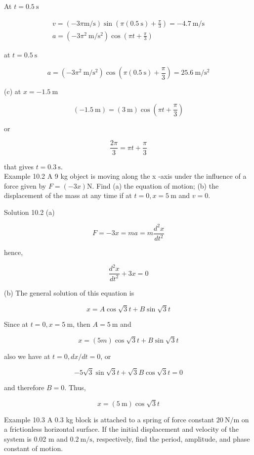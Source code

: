 \documentclass[10pt]{article}
\begin{document}
At $t=0.5 \mathrm{~s}$

$$
\begin{gathered}
v=(-3 \pi \mathrm{m} / \mathrm{s}) \sin \left(\pi(0.5 \mathrm{~s})+\frac{\pi}{3}\right)=-4.7 \mathrm{~m} / \mathrm{s} \\
a=\left(-3 \pi^{2} \mathrm{~m} / \mathrm{s}^{2}\right) \cos \left(\pi t+\frac{\pi}{3}\right)
\end{gathered}
$$

at $t=0.5 \mathrm{~s}$

$$
a=\left(-3 \pi^{2} \mathrm{~m} / \mathrm{s}^{2}\right) \cos \left(\pi(0.5 \mathrm{~s})+\frac{\pi}{3}\right)=25.6 \mathrm{~m} / \mathrm{s}^{2}
$$

(c) at $x=-1.5 \mathrm{~m}$

$$
(-1.5 \mathrm{~m})=(3 \mathrm{~m}) \cos \left(\pi t+\frac{\pi}{3}\right)
$$

or

$$
\frac{2 \pi}{3}=\pi t+\frac{\pi}{3}
$$

that gives $t=0.3 \mathrm{~s}$.\\
Example 10.2 A 9 kg object is moving along the x -axis under the influence of a force given by $F=(-3 x) \mathrm{N}$. Find (a) the equation of motion; (b) the displacement of the mass at any time if at $t=0, x=5 \mathrm{~m}$ and $v=0$.

Solution 10.2 (a)

$$
F=-3 x=m a=m \frac{d^{2} x}{d t^{2}}
$$

hence,

$$
\frac{d^{2} x}{d t^{2}}+3 x=0
$$

(b) The general solution of this equation is

$$
x=A \cos \sqrt{3} t+B \sin \sqrt{3} t
$$

Since at $t=0, x=5 \mathrm{~m}$, then $A=5 \mathrm{~m}$ and

$$
x=(5 m) \cos \sqrt{3} t+B \sin \sqrt{3} t
$$

also we have at $t=0, d x / d t=0$, or

$$
-5 \sqrt{3} \sin \sqrt{3} t+\sqrt{3} B \cos \sqrt{3} t=0
$$

and therefore $B=0$. Thus,

$$
x=(5 \mathrm{~m}) \cos \sqrt{3} t
$$

Example 10.3 A 0.3 kg block is attached to a spring of force constant $20 \mathrm{~N} / \mathrm{m}$ on a frictionless horizontal surface. If the initial displacement and velocity of the system is 0.02 m and $0.2 \mathrm{~m} / \mathrm{s}$, respectively, find the period, amplitude, and phase constant of motion.
\end{document}
